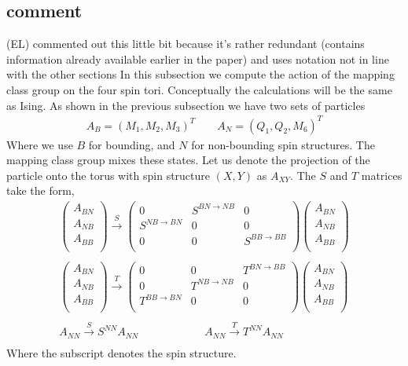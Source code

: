 \documentclass[12pt,a4paper]{article}
\newcounter{arrow}
\newcommand{\ethan}[1]{{\color{amethyst}\footnotesize{(EL) #1}}}
\begin{document}
\subsection{comment}
\ethan{commented out this little bit because it's rather redundant (contains information already available earlier in the paper) and uses notation not in line with the other sections}
In this subsection we compute the action of the mapping class group on the four spin tori. 
Conceptually the calculations will be the same as Ising.
As shown in the previous subsection we have two sets of particles
\begin{align}
A_B = (M_1, M_2, M_3)^{T} \quad \quad A_N = (Q_1, Q_2, M_6)^{T}
\end{align}
Where we use $B$ for bounding, and $N$ for non-bounding spin structures.
The mapping class group mixes these states. 
Let us denote the projection of the particle onto the torus with spin structure $(X,Y)$ as $A_{XY}$.
The $S$ and $T$ matrices take the form,
\begin{align}
\left(\begin{matrix}
A_{BN}\\
A_{NB} \\
A_{BB} \\
\end{matrix} \right)
\xrightarrow{S} \left( \begin{matrix}
0 & S^{BN \rightarrow NB} &0 \\
S^{NB \rightarrow BN} & 0 & 0 \\
0& 0 & S^{BB \rightarrow BB} \\
\end{matrix} \right)
\left(\begin{matrix}
A_{BN}\\
A_{NB} \\
A_{BB} \\
\end{matrix} \right)\\
\\
\left(\begin{matrix}
A_{BN}\\
A_{NB} \\
A_{BB} \\
\end{matrix} \right)
\xrightarrow{T} \left( \begin{matrix}
0 & 0 & T^{BN \rightarrow BB} \\
0 & T^{NB \rightarrow NB} & 0 \\
T^{BB \rightarrow BN} & 0 & 0 \\
\end{matrix} \right)
\left(\begin{matrix}
A_{BN}\\
A_{NB} \\
A_{BB} \\
\end{matrix} \right) \\
\\
A_{NN} \xrightarrow{S} S^{NN} A_{NN} \qquad\qquad\qquad  A_{NN} \xrightarrow{T} T^{NN} A_{NN} \\
\end{align}
Where the subscript denotes the spin structure. 
 
\end{document}
